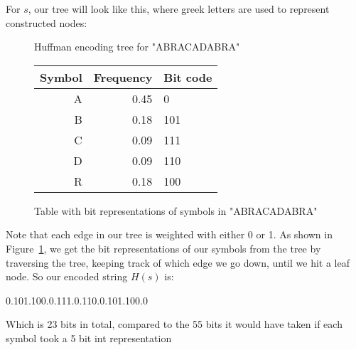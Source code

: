 \documentclass[11pt]{article}
\newcommand\genref{}
\newcommand\figref{}
\def\genref#1#2{#1~\ref{#2}}
\def\figref#1{\genref{Figure}{#1}}
\begin{document}
For $s$, our tree will look like this, where greek letters are used to represent constructed nodes:
\begin{figure}[H]\begin{center}\caption{Huffman encoding tree for "ABRACADABRA"}\end{center}\end{figure}
\begin{figure}[H]\label{huffman-table-fig}\begin{center}\begin{tabular}{ r | r | l }
	Symbol & Frequency & Bit code\\
	\hline
	A & 0.45 & 0\\
	B & 0.18 & 101\\
	C & 0.09 & 111\\
	D & 0.09 & 110\\
	R & 0.18 & 100\\
\end{tabular}\caption{Table with bit representations of symbols in "ABRACADABRA"}\end{center}\end{figure}
Note that each edge in our tree is weighted with either 0 or 1.
As shown in \figref{huffman-table-fig}, we get the bit representations of our symbols from the tree by traversing the 
tree, keeping track of which edge we go down, until we hit a leaf node. So our encoded string $H(s)$ is:
\begin{center}0.101.100.0.111.0.110.0.101.100.0\end{center}
Which is 23 bits in total, compared to the 55 bits it would have taken if each symbol took a 5 bit int representation 
\end{document}
